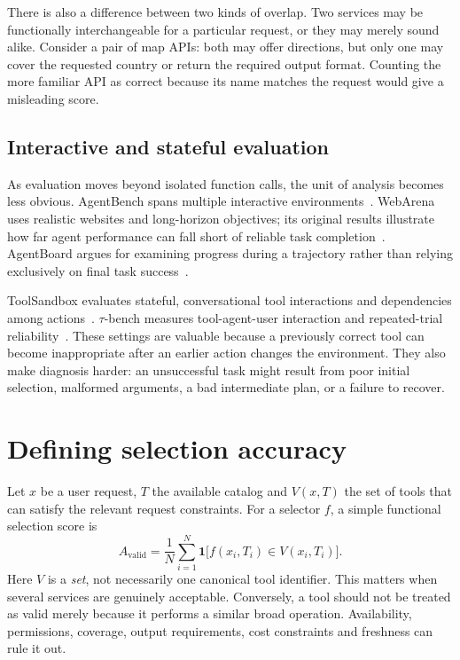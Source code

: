 \documentclass[10pt,a4paper]{article}
\begin{document}
There is also a difference between two kinds of overlap. Two services may be functionally interchangeable for a particular request, or they may merely sound alike. Consider a pair of map APIs: both may offer directions, but only one may cover the requested country or return the required output format. Counting the more familiar API as correct because its name matches the request would give a misleading score.

\subsection{Interactive and stateful evaluation}
As evaluation moves beyond isolated function calls, the unit of analysis becomes less obvious. AgentBench spans multiple interactive environments~\cite{agentbench}. WebArena uses realistic websites and long-horizon objectives; its original results illustrate how far agent performance can fall short of reliable task completion~\cite{webarena}. AgentBoard argues for examining progress during a trajectory rather than relying exclusively on final task success~\cite{agentboard}.

ToolSandbox evaluates stateful, conversational tool interactions and dependencies among actions~\cite{toolsandbox}. $\tau$-bench measures tool-agent-user interaction and repeated-trial reliability~\cite{taubench}. These settings are valuable because a previously correct tool can become inappropriate after an earlier action changes the environment. They also make diagnosis harder: an unsuccessful task might result from poor initial selection, malformed arguments, a bad intermediate plan, or a failure to recover.

\section{Defining selection accuracy}
Let $x$ be a user request, $T$ the available catalog and $V(x,T)$ the set of tools that can satisfy the relevant request constraints. For a selector $f$, a simple functional selection score is
\begin{equation}
 A_{\mathrm{valid}}=\frac{1}{N}\sum_{i=1}^{N}\mathbf{1}\big[f(x_i,T_i)\in V(x_i,T_i)\big].
\end{equation}
Here $V$ is a \emph{set}, not necessarily one canonical tool identifier. This matters when several services are genuinely acceptable. Conversely, a tool should not be treated as valid merely because it performs a similar broad operation. Availability, permissions, coverage, output requirements, cost constraints and freshness can rule it out.
\end{document}
